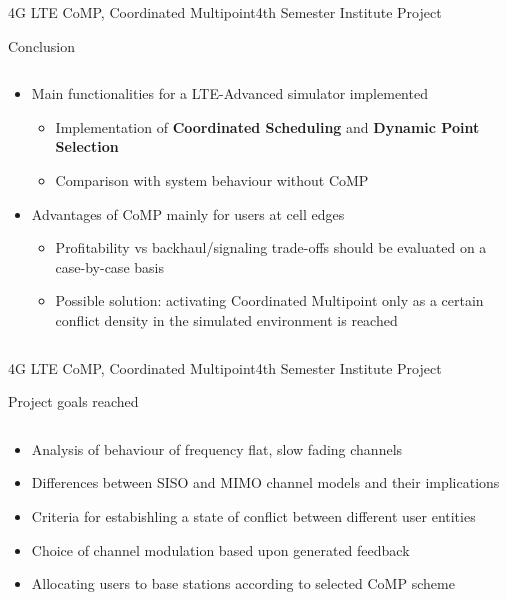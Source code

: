 \documentclass[xcolor={cmyk}]{beamer}
\begin{document}
\begin{frame}{4G LTE CoMP, Coordinated Multipoint}{4th Semester Institute Project}
	\begin{block}{Conclusion}
		\begin{columns}
			\begin{column}{.9\textwidth}
				\begin{itemize}
					\item Main functionalities for a LTE-Advanced simulator implemented
					\begin{itemize}
						\item Implementation of \textbf{Coordinated Scheduling} and \textbf{Dynamic Point Selection}
						\item Comparison with system behaviour without CoMP
					\end{itemize}
					\item Advantages of CoMP mainly for users at cell edges
					\begin{itemize}
						\item Profitability vs backhaul/signaling trade-offs should be evaluated on a case-by-case basis
						\item Possible solution: activating Coordinated Multipoint only as a certain conflict density in the simulated environment is reached
					\end{itemize}
				\end{itemize}
			\end{column}
		\end{columns}
	\end{block}
\end{frame}

\begin{frame}{4G LTE CoMP, Coordinated Multipoint}{4th Semester Institute Project}
	 \begin{block}{Project goals reached}
	 	\begin{columns}
			\begin{column}{.9\textwidth}
				\begin{itemize}
					\item Analysis of behaviour of frequency flat, slow fading channels
					\item Differences between SISO and MIMO channel models and their implications
					\item Criteria for estabishling a state of conflict between different user entities
					\item Choice of channel modulation based upon generated feedback
					\item Allocating users to base stations according to selected CoMP scheme
				\end{itemize}
			\end{column}
		\end{columns}
	 \end{block}
 \end{frame}
\end{document}
